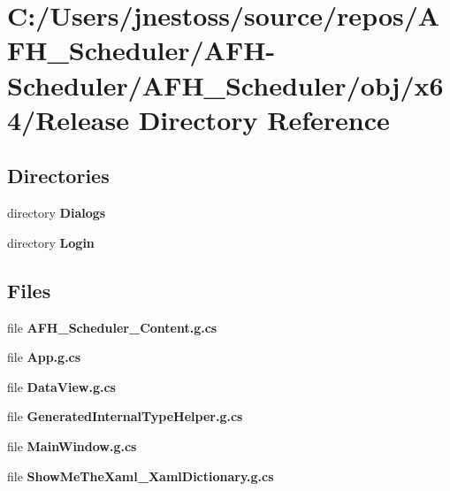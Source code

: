 \section{C\+:/\+Users/jnestoss/source/repos/\+A\+F\+H\+\_\+\+Scheduler/\+A\+F\+H-\/\+Scheduler/\+A\+F\+H\+\_\+\+Scheduler/obj/x64/\+Release Directory Reference}
\label{dir_959486ff5b364f6b21a464bfcb9ab4e4}
\subsection*{Directories}
\begin{DoxyCompactItemize}
\item 
directory \textbf{ Dialogs}
\item 
directory \textbf{ Login}
\end{DoxyCompactItemize}
\subsection*{Files}
\begin{DoxyCompactItemize}
\item 
file \textbf{ A\+F\+H\+\_\+\+Scheduler\+\_\+\+Content.\+g.\+cs}
\item 
file \textbf{ App.\+g.\+cs}
\item 
file \textbf{ Data\+View.\+g.\+cs}
\item 
file \textbf{ Generated\+Internal\+Type\+Helper.\+g.\+cs}
\item 
file \textbf{ Main\+Window.\+g.\+cs}
\item 
file \textbf{ Show\+Me\+The\+Xaml\+\_\+\+Xaml\+Dictionary.\+g.\+cs}
\end{DoxyCompactItemize}
